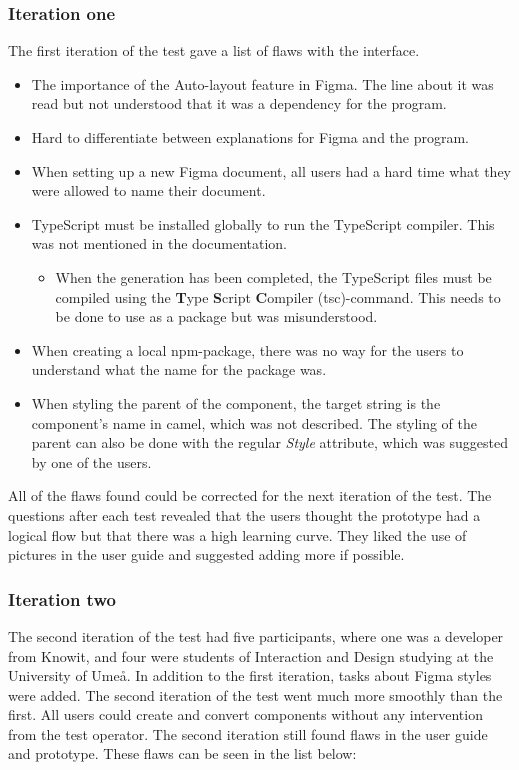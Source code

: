 \subsubsection{Iteration one}%
\label{ssub:Iteration one}
The first iteration of the test gave a list of flaws with the interface.
\begin{itemize}
   \item The importance of the Auto-layout feature in Figma. The line about it was read but not understood that it was a dependency for the program. 
   \item Hard to differentiate between explanations for Figma and the program.
   \item When setting up a new Figma document, all users had a hard time what they were allowed to name their document.
   \item TypeScript must be installed globally to run the TypeScript compiler. This was not mentioned in the documentation. 
      \begin{itemize}
         \item When the generation has been completed, the TypeScript files must be compiled using the \textbf{T}ype \textbf{S}cript \textbf{C}ompiler (tsc)-command. This needs to be done to use as a package but was misunderstood.
      \end{itemize}
   \item When creating a local \acrshort{npm}-package, there was no way for the users to understand what the name for the package was. 
   \item When styling the parent of the component, the target string is the component's name in \gls{camel}, which was not described. The styling of the parent can also be done with the regular \textit{Style} attribute, which was suggested by one of the users.
\end{itemize}

All of the flaws found could be corrected for the next iteration of the test. The questions after each test revealed that the users thought the prototype had a logical flow but that there was a high learning curve. They liked the use of pictures in the user guide and suggested adding more if possible.  

\subsubsection{Iteration two}%
\label{ssub:Iteration two}
The second iteration of the test had five participants, where one was a developer from Knowit, and four were students of Interaction and Design studying at the University of Umeå. In addition to the first iteration, tasks about Figma styles were added. The second iteration of the test went much more smoothly than the first. All users could create and convert components without any intervention from the test operator. The second iteration still found flaws in the user guide and prototype. These flaws can be seen in the list below:

